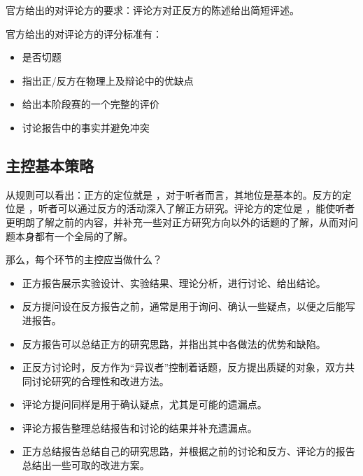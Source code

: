 \documentclass[a4paper,10pt,english]{sphinxmanual}
\begin{document}
官方给出的对评论方的要求：评论方对正反方的陈述给出简短评述。

官方给出的对评论方的评分标准有：
\begin{itemize}
\item {} 
是否切题

\item {} 
指出正/反方在物理上及辩论中的优缺点

\item {} 
给出本阶段赛的一个完整的评价

\item {} 
讨论报告中的事实并避免冲突

\end{itemize}


\subsection{主控基本策略}
\label{\detokenize{7. Tournament:id6}}
从规则可以看出：正方的定位就是  ，对于听者而言，其地位是基本的。反方的定位是  ，听者可以通过反方的活动深入了解正方研究。评论方的定位是  ，能使听者更明朗了解之前的内容，并补充一些对正方研究方向以外的话题的了解，从而对问题本身都有一个全局的了解。

那么，每个环节的主控应当做什么？
\begin{itemize}
\item {} 
正方报告展示实验设计、实验结果、理论分析，进行讨论、给出结论。

\item {} 
反方提问设在反方报告之前，通常是用于询问、确认一些疑点，以便之后能写进报告。

\item {} 
反方报告可以总结正方的研究思路，并指出其中各做法的优势和缺陷。

\item {} 
正反方讨论时，反方作为“异议者”控制着话题，反方提出质疑的对象，双方共同讨论研究的合理性和改进方法。

\item {} 
评论方提问同样是用于确认疑点，尤其是可能的遗漏点。

\item {} 
评论方报告整理总结报告和讨论的结果并补充遗漏点。

\item {} 
正方总结报告总结自己的研究思路，并根据之前的讨论和反方、评论方的报告总结出一些可取的改进方案。

\end{itemize}
\end{document}
